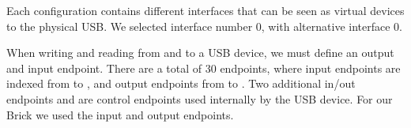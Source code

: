 Each configuration contains different interfaces that can be seen as virtual devices to the
physical USB. We selected interface number 0, with alternative interface 0.

When writing and reading from and to a USB device, we must define an output and input endpoint.
There are a total of 30 endpoints, where input endpoints are indexed from  to
, and output endpoints from  to . Two additional in/out endpoints
 and  are control endpoints used internally by the USB device. For our Brick
we used the input  and output  endpoints.
